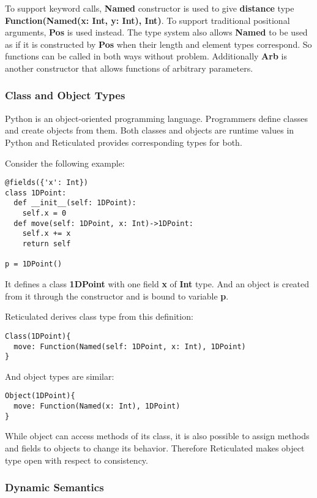 To support keyword calls, \textbf{Named} constructor is used to give
\textbf{distance} type \textbf{Function(Named(x: Int, y: Int), Int)}.
To support traditional positional arguments, \textbf{Pos} is used instead.
The type system also allows \textbf{Named} to be used as if it is constructed by \textbf{Pos}
when their length and element types correspond. So functions can be called in both
ways without problem. Additionally \textbf{Arb} is another constructor
that allows functions of arbitrary parameters.

\subsubsection{Class and Object Types}

Python is an object-oriented programming language.
Programmers define classes and create objects from them.
Both classes and objects are runtime values in Python
and Reticulated provides corresponding types for both.

Consider the following example:

\begin{verbatim}
@fields({'x': Int})
class 1DPoint:
  def __init__(self: 1DPoint):
    self.x = 0
  def move(self: 1DPoint, x: Int)->1DPoint:
    self.x += x
    return self

p = 1DPoint()
\end{verbatim}

It defines a class \textbf{1DPoint} with one field \textbf{x} of \textbf{Int} type.
And an object is created from it through the constructor
and is bound to variable \textbf{p}.

Reticulated derives class type from this definition:

\begin{verbatim}
Class(1DPoint){
  move: Function(Named(self: 1DPoint, x: Int), 1DPoint)
}
\end{verbatim}

And object types are similar:

\begin{verbatim}
Object(1DPoint){
  move: Function(Named(x: Int), 1DPoint)
}
\end{verbatim}

While object can access methods of its class, it is also possible
to assign methods and fields to objects to change its behavior.
Therefore Reticulated makes object type open with respect to consistency.

\subsubsection{Dynamic Semantics}

